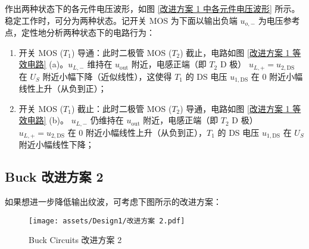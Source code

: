 \documentclass[UTF8]{article}
\theoremstyle{MyLineTheoremStyle} %
\theoremstyle{MyBlockTheoremStyle} %
\theoremstyle{MySubsubsectionStyle} %
\begin{document}
作出两种状态下的各元件电压波形，如图 \ref{改进方案 1 中各元件电压波形} 所示。稳定工作时，可分为两种状态。记开关 MOS 为下面以输出负端 $u_{o, -}$ 为电压参考点，定性地分析两种状态下的电路行为：
\begin{enumerate}
\item 开关 MOS ($T_1$) 导通：此时二极管 MOS ($T_2$) 截止，电路如图 \ref{改进方案 1 等效电路} (a)。$u_{L, -}$ 维持在 $u_\text{out}$ 附近，电感正端（即 $T_2$ D 极）
$u_{L, +} = u_{2, \text{DS}}$ 在 $U_S$ 附近小幅下降（近似线性），这使得 $T_1$ 的 DS 电压 $u_{1, \text{DS}}$ 在 0 附近小幅线性上升（从负到正）；
\item 开关 MOS ($T_1$) 截止：此时二极管 MOS ($T_2$) 导通，电路如图 \ref{改进方案 1 等效电路} (b)。
$u_{L, -}$ 仍维持在 $u_\text{out}$ 附近，电感正端（即 $T_2$ D 极）
$u_{L, +} = u_{2, \text{DS}}$ 在 $0$ 附近小幅线性上升（从负到正），$T_1$ 的 DS 电压 $u_{1, \text{DS}}$ 在 $U_S$ 附近小幅线性下降；
\end{enumerate}



\subsection{Buck 改进方案 2}
如果想进一步降低输出纹波，可考虑下图所示的改进方案：
\begin{figure}[H]\centering
    \texttt{[image: assets/Design1/改进方案 2.pdf]}
    \caption{Buck Circuits 改进方案 2}
\end{figure}
\end{document}
